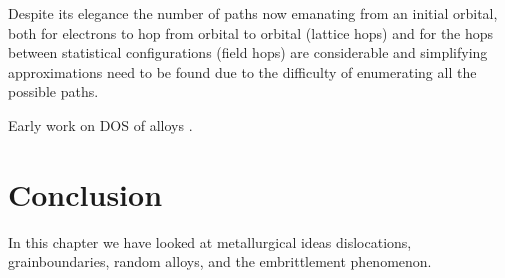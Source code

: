 Despite its elegance the number of paths now emanating from an initial orbital, both
for electrons to hop from orbital to orbital (lattice hops) and for the hops between 
statistical configurations (field hops) are considerable and simplifying approximations 
need to be found due to the difficulty of enumerating all the possible paths.

Early work on DOS of alloys \cite{cubiotti77}. 


\section{Conclusion}
In this chapter we have looked at metallurgical ideas dislocations, 
grainboundaries, random alloys, and the embrittlement phenomenon.

